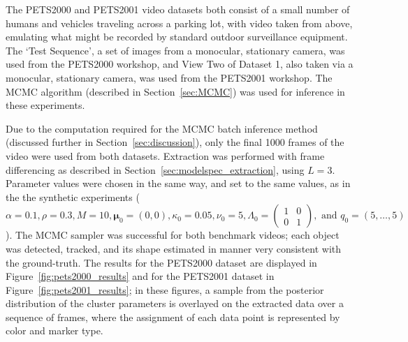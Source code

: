 \documentclass[smallcondensed, final]{svjour3}
\begin{document}
The PETS2000 and PETS2001 video datasets both consist of a small number of humans and vehicles traveling across a parking lot, with video taken from above, emulating what might be recorded by standard outdoor surveillance equipment. The `Test Sequence', a set of images from a monocular, stationary camera, was used from the PETS2000 workshop, and View Two of Dataset 1, also taken via a monocular, stationary camera, was used from the PETS2001 workshop. The MCMC algorithm (described in Section~\ref{sec:MCMC}) was used for inference in these experiments.

Due to the computation required for the MCMC batch inference method (discussed further in Section~\ref{sec:discussion}), only the final 1000 frames of the video were used from both datasets. Extraction was performed with frame differencing as described in Section~\ref{sec:modelspec_extraction}, using $L=3$. Parameter values were chosen in the same way, and set to the same values, as in the the synthetic experiments ($\alpha = 0.1, \rho = 0.3, M = 10, \boldsymbol{\mu}_{0} = (0,0), \kappa_{0} = 0.05, \nu_{0} = 5, \Lambda_{0} = \left( \begin{smallmatrix} 1&0\\ 0&1 \end{smallmatrix} \right), \text{ and } q_{0} = (5, \ldots, 5)$). The MCMC sampler was successful for both benchmark videos; each object was detected, tracked, and its shape estimated in manner very consistent with the ground-truth. The results for the PETS2000 dataset are displayed in Figure~\ref{fig:pets2000_results} and for the PETS2001 dataset in Figure~\ref{fig:pets2001_results}; in these figures, a sample from the posterior distribution of the cluster parameters is overlayed on the extracted data over a sequence of frames, where the assignment of each data point is represented by color and marker type.
\end{document}
